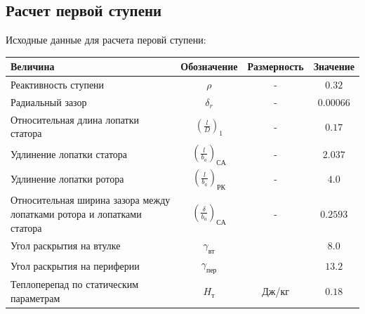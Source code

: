 \documentclass[a4paper,10pt]{article}
\begin{document}
\subsection{Расчет первой ступени}
Исходные данные для расчета перовй ступени:

\begin{center}
	\begin{tabular}{|p{7cm}|c|c|c|}
		\hline
		\textbf{Величина} & \textbf{Обозначение} & \textbf{Размерность} & \textbf{Значение} \\ \hline
		Реактивность ступени & $\rho$ & - & $0.32$ \\ \hline
		Радиальный зазор & $\delta_r$ & - & $0.00066$ \\ \hline
		Относительная длина лопатки статора & $\left( \frac{l}{D} \right)_1$ & - & $0.17$ \\ \hline
		Удлинение лопатки статора & $\left( \frac{l}{b_a} \right)_{СА}$ & - & $2.037$ \\ \hline 
		Удлинение лопатки ротора & $\left( \frac{l}{b_a} \right)_{РК}$ & - & $4.0$ \\ \hline 
		Относительная ширина зазора между лопатками ротора и лопатками статора & $\left( \frac{\delta}{b_a} \right)_{СА}$ & - & $0.2593$ \\ \hline
		Угол раскрытия на втулке & $\gamma_{вт}$ & \degree & $8.0$ \\ \hline
		Угол раскрытия на периферии & $\gamma_{пер}$ & \degree & $13.2$ \\ \hline
		Теплоперепад по статическим параметрам & $H_т$ & Дж/кг & $0.18$ \\ \hline
				
	\end{tabular}
\end{center}
\end{document}

